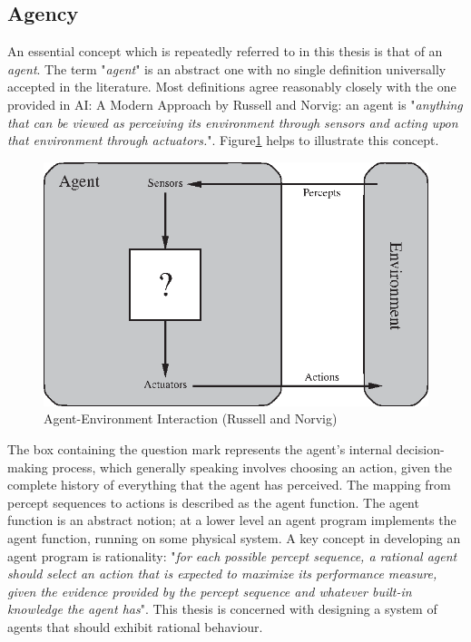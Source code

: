 
\subsection{Agency}
An essential concept which is repeatedly referred to in this thesis is that of an \emph{agent}. The term "\textit{agent}" is an abstract one with no single definition universally accepted in the literature. Most definitions agree reasonably closely with the one provided in AI: A Modern Approach by Russell and Norvig: an agent is "\textit{anything that can be viewed as perceiving its environment through sensors and acting upon that environment through actuators.}"\cite{AIAMA}.  Figure\ref{fig:agent_env_interaction} helps to illustrate this concept. \begin{figure}
    \centering
    \includegraphics{Chapters/BackgroundKnowledgeAndRelatedWork/Figs/Vector/agent-environment.eps}
    \caption{Agent-Environment Interaction (Russell and Norvig)\cite[p.~35]{AIAMA}}
    \label{fig:agent_env_interaction}
\end{figure}
The box containing the question mark represents the agent's internal decision-making process, which generally speaking involves choosing an action, given the complete history of everything that the agent has perceived. The mapping from percept sequences to actions is described as the agent function. The agent function is an abstract notion; at a lower level an agent program implements the agent function, running on some physical system. A key concept in developing an agent program is rationality: "\textit{for each possible percept sequence, a rational agent should select an action that is expected to maximize its performance measure, given the evidence provided by the percept sequence and whatever built-in knowledge the agent has}"\cite[p.~37]{AIAMA}. This thesis is concerned with designing a system of agents that should exhibit rational behaviour.\newline
 

